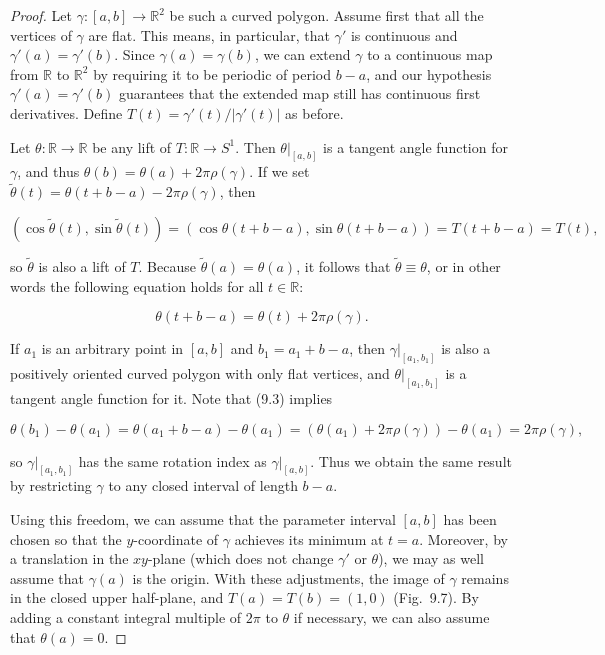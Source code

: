 \begin{proof}
Let $\gamma : [a,b] \to \mathbb{R}^2$ be such a curved polygon. Assume first that all the vertices of $\gamma$ are flat. This means, in particular, that $\gamma'$ is continuous and $\gamma'(a) = \gamma'(b)$.
Since $\gamma(a) = \gamma(b)$, we can extend $\gamma$ to a continuous map from $\mathbb{R}$ to $\mathbb{R}^2$ by requiring it to be periodic of period $b - a$, and our hypothesis $\gamma'(a) = \gamma'(b)$ guarantees that the extended map still has continuous first derivatives. Define $T(t) = \gamma'(t)/|\gamma'(t)|$ as before.

Let $\theta : \mathbb{R} \to \mathbb{R}$ be any lift of $T : \mathbb{R} \to S^1$. Then $\theta|_{[a,b]}$ is a tangent angle function for $\gamma$, and thus $\theta(b) = \theta(a) + 2\pi\rho(\gamma)$. If we set $\tilde{\theta}(t) = \theta(t + b - a) - 2\pi\rho(\gamma)$, then

$$(\cos \tilde{\theta}(t), \sin \tilde{\theta}(t)) = (\cos \theta(t + b - a), \sin \theta(t + b - a)) = T(t + b - a) = T(t),$$

so $\tilde{\theta}$ is also a lift of $T$. Because $\tilde{\theta}(a) = \theta(a)$, it follows that $\tilde{\theta} \equiv \theta$, or in other words the following equation holds for all $t \in \mathbb{R}$:

\begin{equation}
\theta(t + b - a) = \theta(t) + 2\pi\rho(\gamma). \tag{9.3}
\end{equation}

If $a_1$ is an arbitrary point in $[a,b]$ and $b_1 = a_1 + b - a$, then $\gamma|_{[a_1,b_1]}$ is also a positively oriented curved polygon with only flat vertices, and $\theta|_{[a_1,b_1]}$ is a tangent angle function for it. Note that (9.3) implies

$$\theta(b_1) - \theta(a_1) = \theta(a_1 + b - a) - \theta(a_1) = (\theta(a_1) + 2\pi\rho(\gamma)) - \theta(a_1) = 2\pi\rho(\gamma),$$

so $\gamma|_{[a_1,b_1]}$ has the same rotation index as $\gamma|_{[a,b]}$. Thus we obtain the same result by restricting $\gamma$ to any closed interval of length $b - a$.

Using this freedom, we can assume that the parameter interval $[a,b]$ has been chosen so that the $y$-coordinate of $\gamma$ achieves its minimum at $t = a$. Moreover, by a translation in the $xy$-plane (which does not change $\gamma'$ or $\theta$), we may as well assume that $\gamma(a)$ is the origin. With these adjustments, the image of $\gamma$ remains in the closed upper half-plane, and $T(a) = T(b) = (1,0)$ (Fig.\ 9.7). By adding a constant integral multiple of $2\pi$ to $\theta$ if necessary, we can also assume that $\theta(a) = 0$.


\end{proof}
